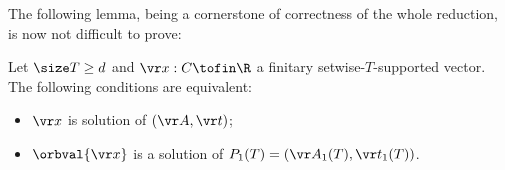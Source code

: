 The following lemma, being a cornerstone of correctness of the whole reduction,
is now not difficult to prove:
%
\begin{lemma} \label{lem:givenT}
Let $\size T \geq d$ and $\vr x : C\tofin \R$ a finitary setwise-$T$-supported vector.
The following conditions are equivalent:
\begin{itemize}
\item 
$\vr x$ is solution of $(\vr A, \vr t)$;
\item
$\orbval {\vr x}$ is a solution of $P_1(T) = (\vr A_1(T), \vr t_1(T))$.
\end{itemize}
\end{lemma}
%
%
